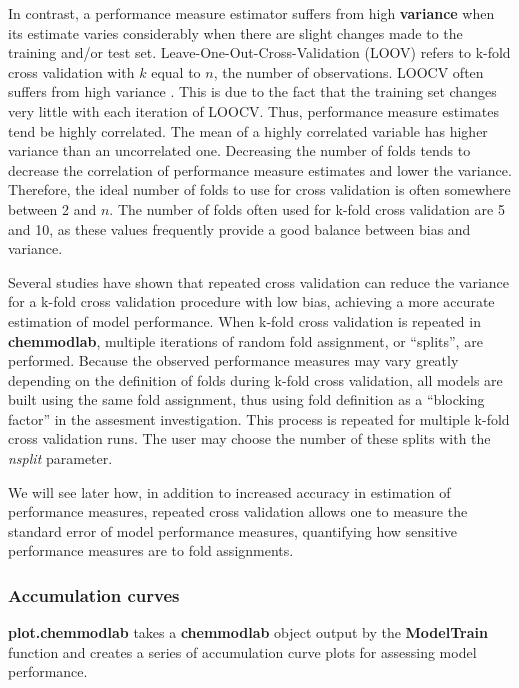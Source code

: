 In contrast, a performance measure estimator suffers from high
\textbf{variance} when its estimate varies considerably when there are
slight changes made to the training and/or test set.
Leave-One-Out-Cross-Validation (LOOV) refers to k-fold cross validation
with \(k\) equal to \(n\), the number of observations. LOOCV often
suffers from high variance \citep{James2013}. This is due to the fact
that the training set changes very little with each iteration of LOOCV.
Thus, performance measure estimates tend be highly correlated. The mean
of a highly correlated variable has higher variance than an uncorrelated
one. Decreasing the number of folds tends to decrease the correlation of
performance measure estimates and lower the variance. Therefore, the
ideal number of folds to use for cross validation is often somewhere
between 2 and \(n\). The number of folds often used for k-fold cross
validation are 5 and 10, as these values frequently provide a good
balance between bias and variance.

Several studies \citep{Molinaro2005, Kim2009, Shen2011} have shown that
repeated cross validation can reduce the variance for a k-fold cross
validation procedure with low bias, achieving a more accurate estimation
of model performance. When k-fold cross validation is repeated in
\textbf{chemmodlab}, multiple iterations of random fold assignment, or
``splits'', are performed. Because the observed performance measures may
vary greatly depending on the definition of folds during k-fold cross
validation, all models are built using the same fold assignment, thus
using fold definition as a ``blocking factor'' in the assesment
investigation. This process is repeated for multiple k-fold cross
validation runs. The user may choose the number of these splits with the
\textit{nsplit} parameter.

We will see later how, in addition to increased accuracy in estimation
of performance measures, repeated cross validation allows one to measure
the standard error of model performance measures, quantifying how
sensitive performance measures are to fold assignments.

\subsubsection{Accumulation curves}\label{accumulation-curves}

\textbf{plot.chemmodlab} takes a \textbf{chemmodlab} object output by
the \textbf{ModelTrain} function and creates a series of accumulation
curve plots for assessing model performance.

